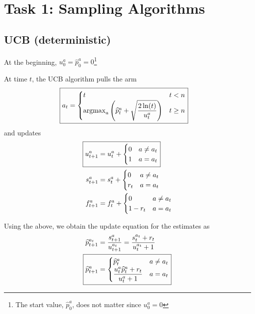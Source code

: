 \section{Task 1: Sampling Algorithms}

\subsection{UCB (deterministic)}
At the beginning, $\boxed{u_0^a = \hat{p}_0^a = 0}$\footnote{The start value, $\hat{p}_0^a$, does not matter since $u_0^a = 0$}

At time $t$, the UCB algorithm pulls the arm
\begin{align*}
    \Aboxed{a_t = {\begin{cases}
        t & t < n \\
        \argmax_{a} \left(\hat{p}_t^a + \sqrt{\dfrac{2\ln(t)}{u_t^a}}\right) & t \geq n
    \end{cases}}}
\end{align*}
and updates
\begin{align*}
    \Aboxed{u_{t + 1}^a &= u_t^a + {\begin{cases}
        0 & a \neq a_t\\
        1 & a = a_t
    \end{cases}}} \\
    s_{t + 1}^a &= s_t^a + \begin{cases}
        0 & a \neq a_t \\
        r_t & a = a_t
    \end{cases} \\
    f_{t + 1}^a &= f_t^a + \begin{cases}
        0 & a \neq a_t \\
        1 - r_t & a = a_t
    \end{cases}
\end{align*}

Using the above, we obtain the update equation for the estimates as
\begin{align*}
    \hat{p}_{t + 1}^{a_t} &= \dfrac{s_{t + 1}^a}{u_{t + 1}^{a_t}} = \dfrac{s_t^{a_t} + r_t}{u_t^{a_t} + 1} \\
    \Aboxed{\hat{p}_{t + 1}^a &= {\begin{cases}
        \hat{p}_t^a & a \neq a_t \\
        \dfrac{u_t^a\hat{p}_t^a + r_t}{u_t^a + 1} & a = a_t
    \end{cases}}}
\end{align*}

